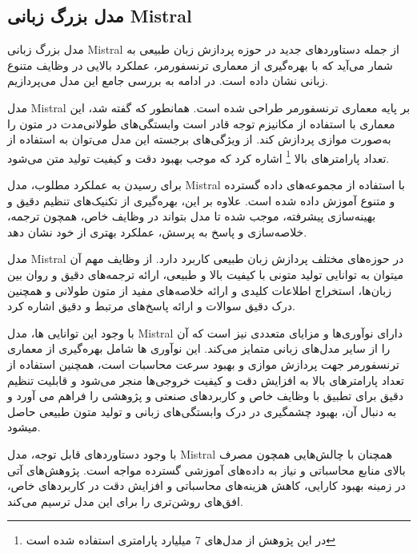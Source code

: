 \subsection{مدل بزرگ زبانی Mistral}


مدل بزرگ زبانی Mistral \cite{mistral} از جمله دستاوردهای جدید در حوزه پردازش زبان طبیعی به شمار می‌آید که با بهره‌گیری از معماری ترنسفورمر، عملکرد بالایی در وظایف متنوع زبانی نشان داده است. در ادامه به بررسی جامع این مدل می‌پردازیم.

مدل Mistral بر پایه معماری ترنسفورمر طراحی شده است. همانطور که گفته شد، این معماری با استفاده از مکانیزم توجه قادر است وابستگی‌های طولانی‌مدت در متون را به‌صورت موازی پردازش کند. از ویژگی‌های برجسته این مدل می‌توان به استفاده از تعداد پارامترهای بالا
\footnote{در این پژوهش از مدل‌های 7 میلیارد پارامتری استفاده شده است}
 اشاره کرد که موجب بهبود دقت و کیفیت تولید متن می‌شود.

برای رسیدن به عملکرد مطلوب، مدل Mistral با استفاده از مجموعه‌های داده گسترده و متنوع آموزش داده شده است. علاوه بر این، بهره‌گیری از تکنیک‌های تنظیم دقیق
 و بهینه‌سازی پیشرفته، موجب شده تا مدل بتواند در وظایف خاص، همچون ترجمه، خلاصه‌سازی و پاسخ به پرسش، عملکرد بهتری از خود نشان دهد.


مدل Mistral در حوزه‌های مختلف پردازش زبان طبیعی کاربرد دارد. از وظایف مهم آن می\/توان به توانایی تولید متونی با کیفیت بالا و طبیعی، ارائه ترجمه‌های دقیق و روان بین زبان‌ها، استخراج اطلاعات کلیدی و ارائه خلاصه‌های مفید از متون طولانی و همچنین درک دقیق سوالات و ارائه پاسخ‌های مرتبط و دقیق اشاره کرد.


با وجود این توانایی ها، مدل Mistral دارای نوآوری‌ها و مزایای متعددی نیز است که آن را از سایر مدل‌های زبانی متمایز می‌کند. این نوآوری ها شامل بهره‌گیری از معماری ترنسفورمر جهت پردازش موازی و بهبود سرعت محاسبات است، همچنین استفاده از تعداد پارامترهای بالا به افزایش دقت و کیفیت خروجی‌ها منجر می‌شود و قابلیت تنظیم دقیق برای تطبیق با وظایف خاص و کاربردهای صنعتی و پژوهشی را فراهم می آورد و به دنبال آن، بهبود چشمگیری در درک وابستگی‌های زبانی و تولید متون طبیعی حاصل می\/شود.


با وجود دستاوردهای قابل توجه، مدل Mistral همچنان با چالش‌هایی همچون مصرف بالای منابع محاسباتی و نیاز به داده‌های آموزشی گسترده مواجه است. پژوهش‌های آتی در زمینه بهبود کارایی، کاهش هزینه‌های محاسباتی و افزایش دقت در کاربردهای خاص، افق‌های روشن‌تری را برای این مدل ترسیم می‌کند.




